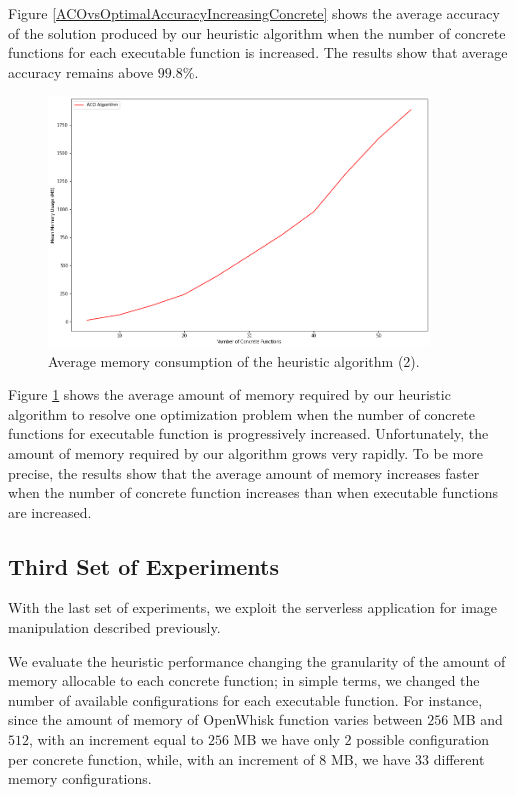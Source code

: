 \documentclass[12pt,a4paper]{report}
\begin{document}
Figure \ref{ACOvsOptimalAccuracyIncreasingConcrete} shows the average accuracy of the solution produced by our heuristic algorithm when the number of concrete functions for each executable function is increased. The results show that average accuracy remains above $99.8$\%.

\begin{figure}[h]
	\centering
	\includegraphics[width=0.9\textwidth]{./Images/ACORamConsumptionIncreasingConcrete.png}
	\caption{Average memory consumption of the heuristic algorithm (2).}%
	\label{ACORamConsumptionIncreasingConcrete}
\end{figure}

Figure \ref{ACORamConsumptionIncreasingConcrete} shows the average amount of memory required by our heuristic algorithm to resolve one optimization problem when the number of concrete functions for executable function is progressively increased. Unfortunately, the amount of memory required by our algorithm grows very rapidly. To be more precise, the results show that the average amount of memory increases faster when the number of concrete function increases than when executable functions are increased.

\newpage
\subsection{Third Set of Experiments}

With the last set of experiments, we exploit the serverless application for image manipulation described previously.

We evaluate the heuristic performance changing the granularity of the amount of memory allocable to each concrete function; in simple terms, we changed the number of available configurations for each executable function. For instance, since the amount of memory of OpenWhisk function varies between $256$ MB and $512$, with an increment equal to $256$ MB we have only $2$ possible configuration per concrete function, while, with an increment of $8$ MB, we have $33$ different memory configurations.
\end{document}
